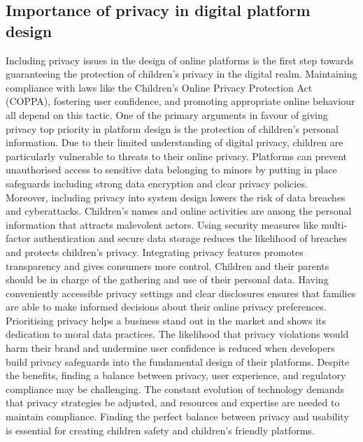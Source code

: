 \documentclass[a4paper, 10 pt, conference]{ieeeconf}  %
\begin{document}
\subsection{Importance of privacy in digital platform design}
Including privacy issues in the design of online platforms is the first step towards guaranteeing the protection of children’s privacy in the digital realm. Maintaining compliance with laws like the Children’s Online Privacy Protection Act (COPPA), fostering user confidence, and promoting appropriate online behaviour all depend on this tactic. One of the primary arguments in favour of giving privacy top priority in platform design is the protection of children’s personal information. Due to their limited understanding of digital privacy, children are particularly vulnerable to threats to their online privacy. Platforms can prevent unauthorised access to sensitive data belonging to minors by putting in place safeguards including strong data encryption and clear privacy policies.
\\ Moreover, including privacy into system design lowers the risk of data breaches and cyberattacks. Children’s names and online activities are among the personal information that attracts malevolent actors. Using security measures like multi-factor authentication and secure data storage reduces the likelihood of breaches and protects children’s privacy. Integrating privacy features promotes transparency and gives consumers more control. Children and their parents should be in charge of the gathering and use of their personal data. Having conveniently accessible privacy settings and clear disclosures ensures that families are able to make informed decisions about their online privacy preferences.
\\ Prioritising privacy helps a business stand out in the market and shows its dedication to moral data practices. The likelihood that privacy violations would harm their brand and undermine user confidence is reduced when developers build privacy safeguards into the fundamental design of their platforms. Despite the benefits, finding a balance between privacy, user experience, and regulatory compliance may be challenging. The constant evolution of technology demands that privacy strategies be adjusted, and resources and expertise are needed to maintain compliance. Finding the perfect balance between privacy and usability is essential for creating children safety and children’s friendly platforms.
\end{document}
